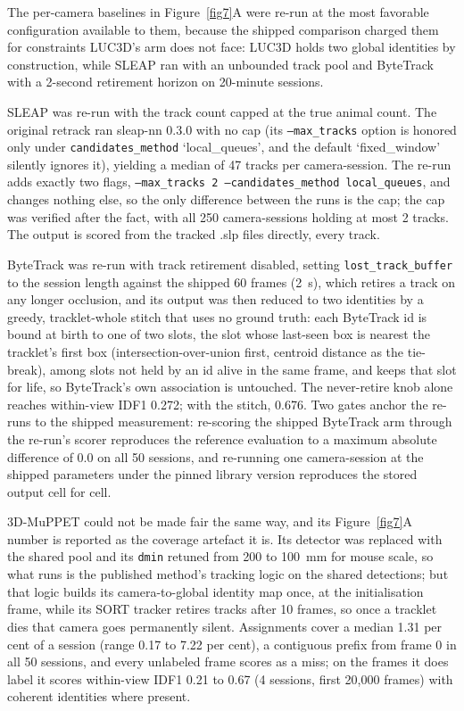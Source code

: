 \documentclass[pdflatex, sn-nature]{sn-jnl}
\theoremstyle{thmstyleone}%
\theoremstyle{thmstyletwo}%
\theoremstyle{thmstylethree}%
\begin{document}
The per-camera baselines in Figure~\ref{fig7}A were re-run at the most favorable configuration available to them, because the shipped comparison charged them for constraints LUC3D's arm does not face: LUC3D holds two global identities by construction, while SLEAP ran with an unbounded track pool and ByteTrack with a 2-second retirement horizon on 20-minute sessions.

SLEAP was re-run with the track count capped at the true animal count. The original retrack ran sleap-nn 0.3.0 with no cap (its \texttt{--max\_tracks} option is honored only under \texttt{candidates\_method} `local\_queues', and the default `fixed\_window' silently ignores it), yielding a median of 47 tracks per camera-session. The re-run adds exactly two flags, \texttt{--max\_tracks 2 --candidates\_method local\_queues}, and changes nothing else, so the only difference between the runs is the cap; the cap was verified after the fact, with all 250 camera-sessions holding at most 2 tracks. The output is scored from the tracked .slp files directly, every track.

ByteTrack was re-run with track retirement disabled, setting \texttt{lost\_track\_buffer} to the session length against the shipped 60 frames (2~s), which retires a track on any longer occlusion, and its output was then reduced to two identities by a greedy, tracklet-whole stitch that uses no ground truth: each ByteTrack id is bound at birth to one of two slots, the slot whose last-seen box is nearest the tracklet's first box (intersection-over-union first, centroid distance as the tie-break), among slots not held by an id alive in the same frame, and keeps that slot for life, so ByteTrack's own association is untouched. The never-retire knob alone reaches within-view IDF1 0.272; with the stitch, 0.676. Two gates anchor the re-runs to the shipped measurement: re-scoring the shipped ByteTrack arm through the re-run's scorer reproduces the reference evaluation to a maximum absolute difference of 0.0 on all 50 sessions, and re-running one camera-session at the shipped parameters under the pinned library version reproduces the stored output cell for cell.

3D-MuPPET could not be made fair the same way, and its Figure~\ref{fig7}A number is reported as the coverage artefact it is. Its detector was replaced with the shared pool and its \texttt{dmin} retuned from 200 to 100~mm for mouse scale, so what runs is the published method's tracking logic on the shared detections; but that logic builds its camera-to-global identity map once, at the initialisation frame, while its SORT tracker retires tracks after 10 frames, so once a tracklet dies that camera goes permanently silent. Assignments cover a median 1.31 per cent of a session (range 0.17 to 7.22 per cent), a contiguous prefix from frame 0 in all 50 sessions, and every unlabeled frame scores as a miss; on the frames it does label it scores within-view IDF1 0.21 to 0.67 (4 sessions, first 20,000 frames) with coherent identities where present.
\end{document}
